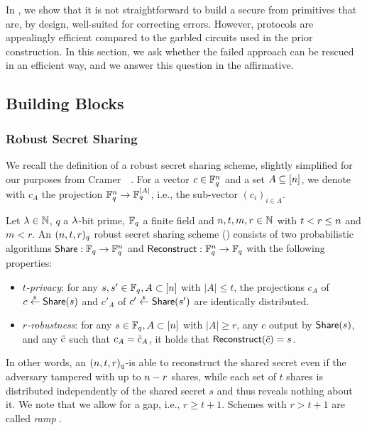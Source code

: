 
In , we show that it is not straightforward to build a secure \FPAKE from primitives that are, by design, well-suited for correcting errors. 
However, \PAKE protocols are appealingly efficient compared to the garbled circuits used in the prior construction. 
In this section, we ask whether the failed approach can be rescued in an efficient way, and we answer this question in the affirmative. 

\subsection{Building Blocks}
\label{sec:preliminaries}

\subsubsection{Robust Secret Sharing}
\label{sec:rss}
We recall the definition of a robust secret sharing scheme, slightly simplified for our purposes from Cramer~\etal~\cite{EC:CDDFS15}.
For a vector $c\in\mathbb{F}_q^{n}$ and a set $A\subseteq [n]$, we denote with $c_A$ the projection $\mathbb{F}_q^{n}\rightarrow \mathbb{F}_q^{|A|}$, i.e., the sub-vector $(c_i)_{i\in A}$.
\begin{definition}
	\label{def:rss}
	Let $\lambda\in\mathbb{N}$, $q$ a $\lambda$-bit prime, $\mathbb{F}_q$ a finite field and $n,t,m,r\in\mathbb{N}$ with $t<r\leq n$ and $m<r$. An $(n,t,r)_q$ robust secret sharing scheme (\RSS) consists of two probabilistic algorithms $\mathsf{Share} : \mathbb{F}_q \to \mathbb{F}_q^{n}$ and $\mathsf{Reconstruct} : \mathbb{F}_q^{n} \to \mathbb{F}_q$ with the following properties:
	\begin{itemize}
		\item \emph{$t$-privacy}: for any $s,s'\in\mathbb{F}_q, A \subset [n]$ with $|A|\leq t$, the projections $c_A$ of $c\stackrel{{}_\$}{\leftarrow}\mathsf{Share}(s)$ and $c'_A$ of $c'\stackrel{{}_\$}{\leftarrow}\mathsf{Share}(s')$ are identically distributed.
		\item \emph{$r$-robustness}: for any $s\in\mathbb{F}_q, A \subset [n]$ with $|A|\geq r$, any $c$ output by $\mathsf{Share}(s)$, and any $\tilde{c}$ such that $c_A = \tilde{c}_A$, it holds that $\mathsf{Reconstruct}(\tilde{c}) = s$.
	\end{itemize}
\end{definition}
In other words, an $(n, t,r)_q$-\RSS is able to reconstruct the shared secret even if the adversary tampered with up to $n-r$ shares, while each set of $t$ shares is distributed independently of the shared secret $s$ and thus reveals nothing about it. We note that we allow for a gap, i.e., $r\ge t+1$. Schemes with $r > t+1$ are called \emph{ramp} \RSS. 

